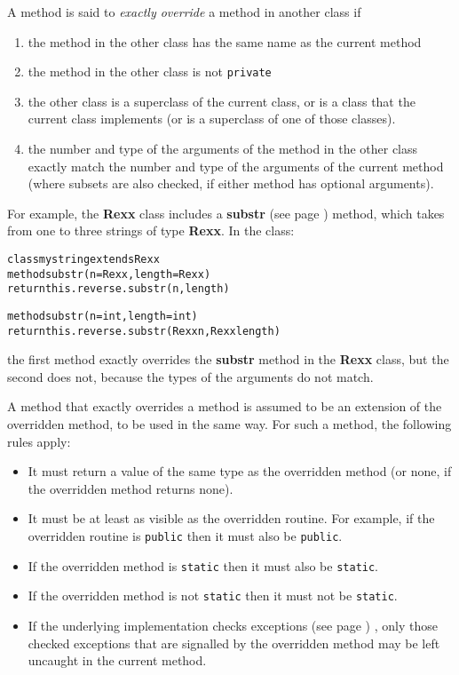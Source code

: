 A method is said to \emph{exactly override} a method in another class
if
\begin{enumerate}
\item the method in the other class has the same name as the current method
\item the method in the other class is not \texttt{private}
\item the other class is a superclass of the current class, or is a class
that the current class implements (or is a superclass of one of those
classes).
\item the number and type of the arguments of the method in the other
class exactly match the number and type of the arguments of the current
method (where subsets are also checked, if either method has optional
arguments).
\end{enumerate}
For example, the \textbf{Rexx} class includes a
 \textbf{substr} (see page \pageref{refsubstr})  method, which takes from one to
three strings of type \textbf{Rexx}.  In the class:
\begin{alltt}
class mystring extends Rexx
  method substr(n=Rexx, length=Rexx)
    return this.reverse.substr(n, length)

  method substr(n=int, length=int)
    return this.reverse.substr(Rexx n, Rexx length)
\end{alltt}
the first method exactly overrides the \textbf{substr} method in
the \textbf{Rexx} class, but the second does not, because the types of
the arguments do not match.
 
A method that exactly overrides a method is assumed to be an extension
of the overridden method, to be used in the same way.  For such a
method, the following rules apply:
\begin{itemize}
\item It must return a value of the same type as the overridden method (or
none, if the overridden method returns none).
\item It must be at least as visible as the overridden routine.
For example, if the overridden routine is \texttt{public} then it must
also be \texttt{public}.
\item If the overridden method is \texttt{static} then it must also
be \texttt{static}.
\item If the overridden method is not \texttt{static} then it must
not be \texttt{static}.
\item If the underlying implementation checks  exceptions (see page \pageref{refexcep}) ,
only those checked exceptions that are signalled by the overridden
method may be left uncaught in the current method.
\end{itemize}
